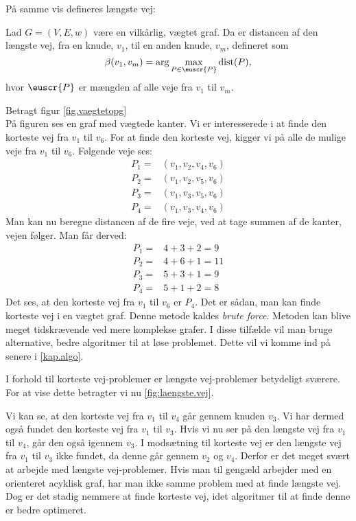 På samme vis defineres længste vej:

\begin{defn} 
	Lad $G=(V,E,w)$ være en vilkårlig, vægtet graf. Da er distancen af den længste vej, fra en knude, $v_1$, til en anden knude, $v_m$, defineret som
	\begin{equation*}
		\beta(v_1,v_m)=\arg \max_{P \in \euscr{P}}
		\textrm{dist}(P),
	\end{equation*}
	hvor $\euscr{P}$ er mængden af alle veje fra $v_1$ til $v_m$.
\end{defn}

\begin{exmp}
Betragt figur \ref{fig.vaegtetopg} \\

På figuren ses en graf med vægtede kanter. Vi er interesserede i at finde den korteste vej fra $v_1$ til $v_6$. For at finde den korteste vej, kigger vi på alle de mulige veje fra $v_1$ til $v_6$.
Følgende veje ses:
\begin{align*}
	P_1=&(v_1,v_2,v_4,v_6)\\
	P_2=&(v_1,v_2,v_5,v_6)\\
	P_3=&(v_1,v_3,v_5,v_6)\\
	P_4=&(v_1,v_3,v_4,v_6)
\end{align*}
Man kan nu beregne distancen af de fire veje, ved at tage summen af de kanter, vejen følger. Man får derved:
\begin{align*}
	P_1=&4+3+2=9\\
	P_2=&4+6+1=11\\
	P_3=&5+3+1=9\\
	P_4=&5+1+2=8
\end{align*}
Det ses, at den korteste vej fra $v_1$ til $v_6$ er $P_4$. 
Det er sådan, man kan finde korteste vej i en vægtet graf. Denne metode kaldes \emph{brute force}. Metoden kan blive meget tidskrævende ved mere komplekse grafer. I disse tilfælde vil man bruge alternative, bedre algoritmer til at løse problemet. Dette vil vi komme ind på senere i \autoref{kap.algo}.
\end{exmp}

I forhold til korteste vej-problemer er længste vej-problemer betydeligt sværere. For at vise dette betragter vi nu \autoref{fig:laengste.vej}.

Vi kan se, at den korteste vej fra $v_1$ til $v_4$ går gennem knuden $v_3$. Vi har dermed også fundet den korteste vej fra $v_1$ til $v_3$.
Hvis vi nu ser på den længste vej fra $v_1$ til $v_4$, går den også igennem $v_3$. I modsætning til korteste vej er den længste vej fra $v_1$ til $v_3$ ikke fundet, da denne går gennem $v_2$ og $v_4$. Derfor er det meget svært at arbejde med længste vej-problemer.
Hvis man til gengæld arbejder med en orienteret acyklisk graf, har man ikke samme problem med at finde længste vej. Dog er det stadig nemmere at finde korteste vej, idet algoritmer til at finde denne er bedre optimeret.
